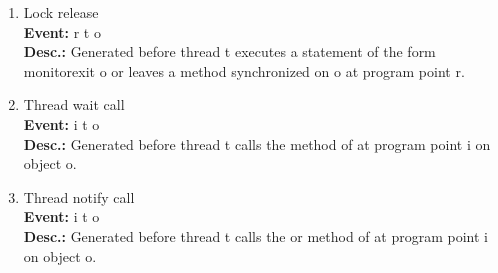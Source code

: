 \begin{enumerate}
\item
Lock release \\
{\bf Event:}  r t o \\
{\bf Desc.:} Generated before thread t executes a statement of the form monitorexit o or leaves a method synchronized on o at program point r.

\item
Thread wait call \\
{\bf Event:}  i t o \\
{\bf Desc.:} Generated before thread t calls the  method of  at program point i on object o.

\item
Thread notify call \\
{\bf Event:}  i t o \\
{\bf Desc.:} Generated before thread t calls the  or  method of  at program point i on object o.
\end{enumerate}
